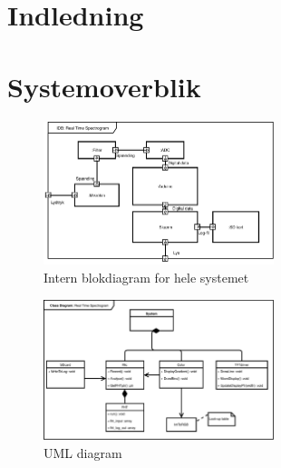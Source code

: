 \section{Indledning}

%
%
%

\section{Systemoverblik}

\begin{figure}[H]
	\center
	\includegraphics[width = 0.6\textwidth]{Figur/IBD.pdf}
	\caption{Intern blokdiagram for hele systemet}
	\label{fig:ibd}
\end{figure}


\begin{figure}[H]
	\center
	\includegraphics[width = 0.6\textwidth]{Figur/UML.pdf}
	\caption{UML diagram}
	\label{fig:uml}
\end{figure}